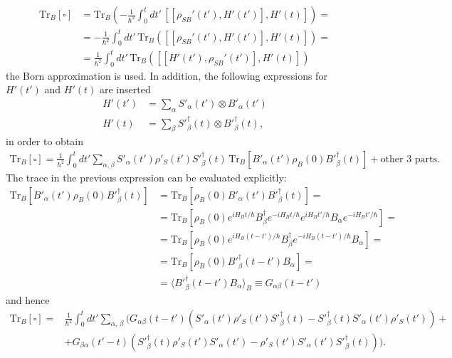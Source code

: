 \begin{itemize}
\begin{align*}
     \text{Tr}_B [\square] &= \text{Tr}_B \left(- \frac{1}{\hbar^2} \int_0^t dt'\, [[\rho_{SB}'(t'), H'(t')], H'(t)] \right) = \\
     &= - \frac{1}{\hbar^2} \int_0^t dt' \, \text{Tr}_B \left([[\rho_{SB}'(t'), H'(t')], H'(t)] \right) = \\
    &= \frac{1}{\hbar^2} \int_0^t dt' \, \text{Tr}_B \left([[H'(t'),\rho_{SB}'(t')], H'(t)] \right)
\end{align*}
the Born approximation is used. In addition, the following expressions for $H'(t')$ and $H'(t)$ are inserted
\begin{align*}
    H'(t') &= \sum_\alpha S'_\alpha(t') \otimes B'_\alpha(t') \\
    H'(t) &= \sum_\beta S'^\dagger_\beta(t) \otimes B'^\dagger_\beta(t),
\end{align*}
in order to obtain 
\begin{align*}
    \text{Tr}_B [\square] = \frac{1}{\hbar^2} \int_0^t dt'\sum_{\alpha, \beta} S'_\alpha(t') \rho'_S(t') S'^\dagger_\beta(t) \, \text{Tr}_B \left[  B'_\alpha(t') \rho_B(0) B'^\dagger_\beta(t) \right] +\text{other 3 parts}.
\end{align*}
The trace in the previous expression can be evaluated explicitly: 
\begin{align*}
    \text{Tr}_B \left[  B'_\alpha(t') \rho_B(0) B'^\dagger_\beta(t) \right] &= \text{Tr}_B \left[ \rho_B(0) B'_\alpha(t')  B'^\dagger_\beta(t) \right] = \\
    &= \text{Tr}_B \left[ \rho_B(0) e^{i H_B t/\hbar} B_\beta^\dagger e^{-i H_B t/\hbar} e^{i H_B t'/\hbar} B_\alpha e^{-i H_B t'/\hbar} \right] = \\
    &= \text{Tr}_B \left[ \rho_B(0) e^{i H_B (t-t')/\hbar} B_\beta^\dagger e^{-i H_B (t-t')/\hbar} B_\alpha \right] = \\
    &= \text{Tr}_B \left[ \rho_B(0) {B'}_\beta^{\dagger}(t-t') B_\alpha \right] = \\
    &= \langle {B'}_\beta^\dagger(t-t') B_\alpha \rangle_B \equiv G_{\alpha \beta} (t-t')
\end{align*}
and hence
\begin{align}
    \text{Tr}_B [\square] =& \frac{1}{\hbar^2} \int_0^t dt' \sum_{\alpha, \, \beta} \bigg( G_{\alpha \beta} (t-t') \left( S'_\alpha(t') \rho'_S(t') S'^\dagger_\beta(t) - {S'}_\beta^\dagger(t) S'_\alpha(t') \rho'_S(t') \right) + \nonumber\\
    &+ G_{ \beta \alpha} (t'-t) \left( {S'}_\beta^\dagger(t) \rho'_S(t') S'_\alpha(t') - \rho'_S(t') S'_\alpha(t') {S'}_\beta^\dagger(t) \right) \bigg).

\end{align}
\end{itemize}
